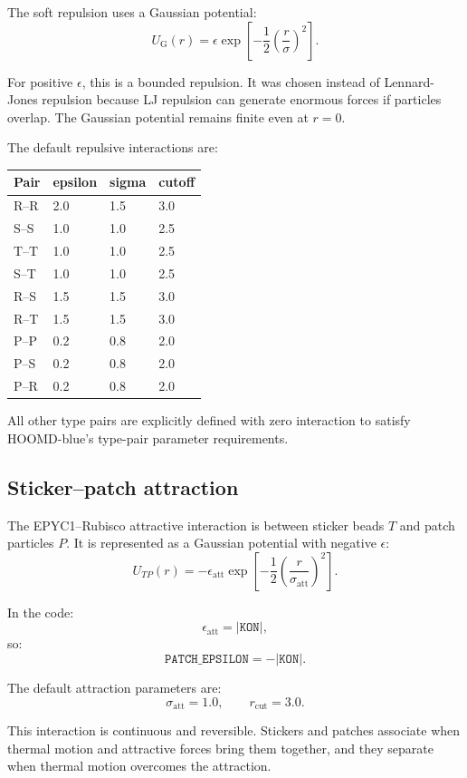 \documentclass[11pt]{article}
\begin{document}
The soft repulsion uses a Gaussian potential:
\[
U_{\mathrm{G}}(r)
=
\epsilon \exp\left[-\frac{1}{2}\left(\frac{r}{\sigma}\right)^2\right].
\]

For positive \(\epsilon\), this is a bounded repulsion. It was chosen instead of Lennard-Jones repulsion because LJ repulsion can generate enormous forces if particles overlap. The Gaussian potential remains finite even at \(r=0\).

The default repulsive interactions are:
\begin{longtable}{>{\ttfamily}p{} p{} p{} p{}}
\toprule
Pair & epsilon & sigma & cutoff \\
\midrule
R--R & 2.0 & 1.5 & 3.0 \\
S--S & 1.0 & 1.0 & 2.5 \\
T--T & 1.0 & 1.0 & 2.5 \\
S--T & 1.0 & 1.0 & 2.5 \\
R--S & 1.5 & 1.5 & 3.0 \\
R--T & 1.5 & 1.5 & 3.0 \\
P--P & 0.2 & 0.8 & 2.0 \\
P--S & 0.2 & 0.8 & 2.0 \\
P--R & 0.2 & 0.8 & 2.0 \\
\bottomrule
\end{longtable}

All other type pairs are explicitly defined with zero interaction to satisfy HOOMD-blue's type-pair parameter requirements.

\subsection{Sticker--patch attraction}

The EPYC1--Rubisco attractive interaction is between sticker beads \(T\) and patch particles \(P\). It is represented as a Gaussian potential with negative \(\epsilon\):
\[
U_{TP}(r)
=
-\epsilon_{\mathrm{att}}
\exp\left[-\frac{1}{2}\left(\frac{r}{\sigma_{\mathrm{att}}}\right)^2\right].
\]

In the code:
\[
\epsilon_{\mathrm{att}} = |\texttt{KON}|,
\]
so:
\[
\texttt{PATCH\_EPSILON} = -|\texttt{KON}|.
\]

The default attraction parameters are:
\[
\sigma_{\mathrm{att}} = 1.0,
\qquad
r_{\mathrm{cut}} = 3.0.
\]

This interaction is continuous and reversible. Stickers and patches associate when thermal motion and attractive forces bring them together, and they separate when thermal motion overcomes the attraction.
\end{document}
